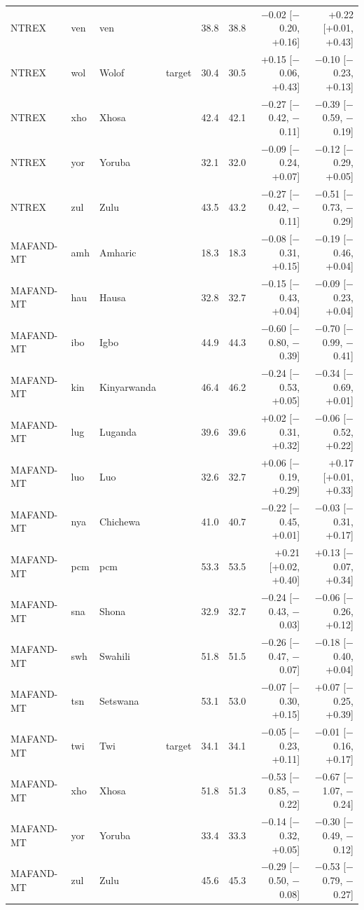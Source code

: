 {\begin{longtable}{@{}lllcrrrr@{}}
NTREX & ven & ven &  & 38.8 & 38.8 & $-$0.02 [$-$0.20, +0.16] & +0.22 [+0.01, +0.43] \\
NTREX & wol & Wolof & target & 30.4 & 30.5 & +0.15 [$-$0.06, +0.43] & $-$0.10 [$-$0.23, +0.13] \\
NTREX & xho & Xhosa &  & 42.4 & 42.1 & $-$0.27 [$-$0.42, $-$0.11] & $-$0.39 [$-$0.59, $-$0.19] \\
NTREX & yor & Yoruba &  & 32.1 & 32.0 & $-$0.09 [$-$0.24, +0.07] & $-$0.12 [$-$0.29, +0.05] \\
NTREX & zul & Zulu &  & 43.5 & 43.2 & $-$0.27 [$-$0.42, $-$0.11] & $-$0.51 [$-$0.73, $-$0.29] \\
MAFAND-MT & amh & Amharic &  & 18.3 & 18.3 & $-$0.08 [$-$0.31, +0.15] & $-$0.19 [$-$0.46, +0.04] \\
MAFAND-MT & hau & Hausa &  & 32.8 & 32.7 & $-$0.15 [$-$0.43, +0.04] & $-$0.09 [$-$0.23, +0.04] \\
MAFAND-MT & ibo & Igbo &  & 44.9 & 44.3 & $-$0.60 [$-$0.80, $-$0.39] & $-$0.70 [$-$0.99, $-$0.41] \\
MAFAND-MT & kin & Kinyarwanda &  & 46.4 & 46.2 & $-$0.24 [$-$0.53, +0.05] & $-$0.34 [$-$0.69, +0.01] \\
MAFAND-MT & lug & Luganda &  & 39.6 & 39.6 & +0.02 [$-$0.31, +0.32] & $-$0.06 [$-$0.52, +0.22] \\
MAFAND-MT & luo & Luo &  & 32.6 & 32.7 & +0.06 [$-$0.19, +0.29] & +0.17 [+0.01, +0.33] \\
MAFAND-MT & nya & Chichewa &  & 41.0 & 40.7 & $-$0.22 [$-$0.45, +0.01] & $-$0.03 [$-$0.31, +0.17] \\
MAFAND-MT & pcm & pcm &  & 53.3 & 53.5 & +0.21 [+0.02, +0.40] & +0.13 [$-$0.07, +0.34] \\
MAFAND-MT & sna & Shona &  & 32.9 & 32.7 & $-$0.24 [$-$0.43, $-$0.03] & $-$0.06 [$-$0.26, +0.12] \\
MAFAND-MT & swh & Swahili &  & 51.8 & 51.5 & $-$0.26 [$-$0.47, $-$0.07] & $-$0.18 [$-$0.40, +0.04] \\
MAFAND-MT & tsn & Setswana &  & 53.1 & 53.0 & $-$0.07 [$-$0.30, +0.15] & +0.07 [$-$0.25, +0.39] \\
MAFAND-MT & twi & Twi & target & 34.1 & 34.1 & $-$0.05 [$-$0.23, +0.11] & $-$0.01 [$-$0.16, +0.17] \\
MAFAND-MT & xho & Xhosa &  & 51.8 & 51.3 & $-$0.53 [$-$0.85, $-$0.22] & $-$0.67 [$-$1.07, $-$0.24] \\
MAFAND-MT & yor & Yoruba &  & 33.4 & 33.3 & $-$0.14 [$-$0.32, +0.05] & $-$0.30 [$-$0.49, $-$0.12] \\
MAFAND-MT & zul & Zulu &  & 45.6 & 45.3 & $-$0.29 [$-$0.50, $-$0.08] & $-$0.53 [$-$0.79, $-$0.27] \\
\end{longtable}}
